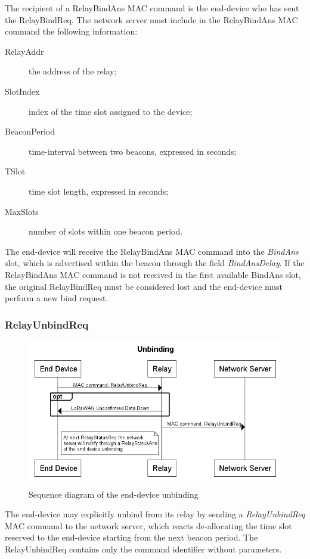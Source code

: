 The recipient of a RelayBindAns MAC command is the end-device who has sent the RelayBindReq. The network server must include in the RelayBindAns MAC command the following information:

\begin{description}
\item[RelayAddr] the address of the relay;
\item[SlotIndex] index of the time slot assigned to the device;
\item[BeaconPeriod] time-interval between two beacons, expressed in seconds;
\item[TSlot] time slot length, expressed in seconds;
\item[MaxSlots] number of slots within one beacon period.
\end{description}
The end-device will receive the RelayBindAns MAC command into the \emph{BindAns} slot, which is advertised within the beacon through the field \emph{BindAnsDelay}. If the RelayBindAns MAC command is not received in the first available BindAns slot, the original RelayBindReq must be considered lost and the end-device must perform a new bind request.

\subsubsection{RelayUnbindReq}

\begin{figure}[!h]
\centering
\includegraphics[width=\textwidth]{img/seqdia/unbinding}
\caption{Sequence diagram of the end-device unbinding}
\label{fig:unbinding}
\end{figure}

The end-device may explicitly unbind from its relay by sending a \emph{RelayUnbindReq} MAC command to the network server, which reacts de-allocating the time slot reserved to the end-device starting from the next beacon period. The RelayUnbindReq contains only the command identifier without parameters.

